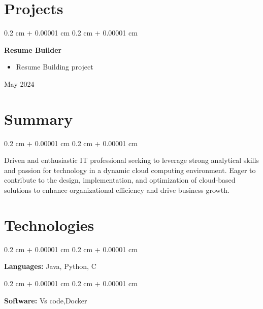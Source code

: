 \documentclass[10pt, letterpaper]{article}
\newenvironment{highlights}{
    \begin{itemize}[
        topsep=0.10 cm,
        parsep=0.10 cm,
        partopsep=0pt,
        itemsep=0pt,
        leftmargin=0.4 cm + 10pt
    ]
}{
    \end{itemize}
} %
\newenvironment{onecolentry}{
    \begin{adjustwidth}{
        0.2 cm + 0.00001 cm
    }{
        0.2 cm + 0.00001 cm
    }
}{
    \end{adjustwidth}
} %
\newenvironment{twocolentry}[2][]{
    \onecolentry
    \def\secondColumn{#2}
    \setcolumnwidth{\fill, 4.5 cm}
    \begin{paracol}{2}
}{
    \switchcolumn \raggedleft \secondColumn
    \end{paracol}
    \endonecolentry
} %
\begin{document}
    
    \section{Projects}

        
        \begin{twocolentry}{
            May 2024
        }
            \textbf{Resume Builder}
            \begin{highlights}
                \item Resume Building project
            \end{highlights}
        \end{twocolentry}



    
    \section{Summary}

        
        \begin{onecolentry}
            Driven and enthusiastic IT professional seeking to leverage strong analytical skills and passion for technology in a dynamic cloud computing environment. Eager to contribute to the design, implementation, and optimization of cloud-based solutions to enhance organizational efficiency and drive business growth.
        \end{onecolentry}


    
    \section{Technologies}

        
        \begin{onecolentry}
            \textbf{Languages:} Java, Python, C
        \end{onecolentry}

        \vspace{0.2 cm}

        \begin{onecolentry}
            \textbf{Software:} Vs code,Docker
        \end{onecolentry}


    
\end{document}
